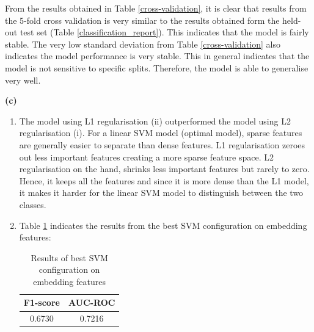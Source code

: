 From the results obtained in Table \ref{cross-validation}, it is clear that results from the 5-fold cross validation is very similar to the results obtained form the held-out test set (Table \ref{classification_report}).
This indicates that the model is fairly stable. The very low standard deviation from Table \ref{cross-validation} also indicates the model performance is very stable. This in general 
indicates that the model is not sensitive to specific splits. Therefore, the model is able to generalise very well.

\noindent\textbf{(c)}
\begin{enumerate}[label=\roman*., topsep=0pt, itemsep=2pt]
    \item The model using L1 regularisation (ii) outperformed the model using L2 regularisation (i). For a linear SVM model (optimal model), sparse features are generally easier to separate
    than dense features. L1 regularisation zeroes out less important features creating a more sparse feature space. L2 regularisation on the hand, shrinks less important features but 
    rarely to zero. Hence, it keeps all the features and since it is more dense than the L1 model, it makes it harder for the linear SVM model to distinguish between the two classes.

    \item Table \ref{embedding_results} indicates the results from the best SVM configuration on embedding features:
        \begin{table}[htbp]
        \caption{Results of best SVM configuration on embedding features}
        \centering
        \begin{tabular}{cc}
            \hline
            \textbf{F1-score} & \textbf{AUC-ROC} \\
            \hline
            0.6730 & 0.7216 \\
            \hline
        \end{tabular}
        \label{embedding_results}
        \end{table}


\end{enumerate}
